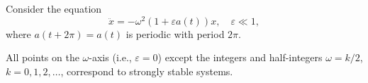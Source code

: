 Consider the equation
$$\ddot{x} = -\omega^2(1 + \varepsilon a(t))x, \quad \varepsilon \ll 1,$$
where $a(t + 2\pi) = a(t)$ is periodic with period $2\pi$.

All points on the $\omega$-axis (i.e., $\varepsilon = 0$) except the integers and half-integers $\omega = k/2$, $k = 0, 1, 2, \ldots$, correspond to strongly stable systems.
